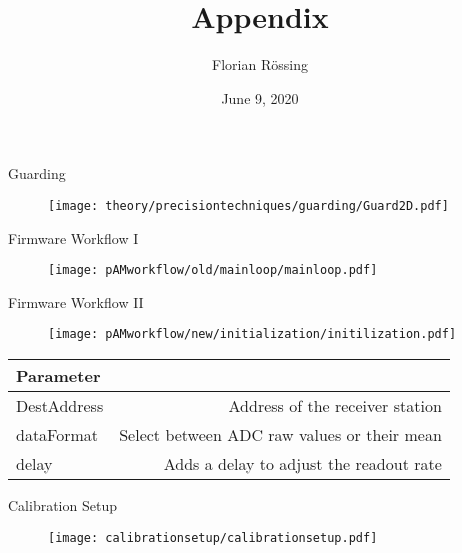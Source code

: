 \documentclass[t]{beamer}
\title{Appendix}
\author{Florian Rössing}
\date{June 9, 2020}
\begin{document}
\begin{frame}{\color{white}{.} }
\maketitle
\end{frame}

\begin{frame}[c]{Guarding}
	\begin{figure}
		\texttt{[image: theory/precisiontechniques/guarding/Guard2D.pdf]}
	\end{figure}
\end{frame}



\begin{frame}[c]{Firmware Workflow I}
	\begin{figure}
		\texttt{[image: pAMworkflow/old/mainloop/mainloop.pdf]}
	\end{figure}
\end{frame}

\begin{frame}[c]{Firmware Workflow II}
	\centering
	\begin{figure}
		\centering
		\texttt{[image: pAMworkflow/new/initialization/initilization.pdf]}
	\end{figure}
	\vspace{-0.5cm}
	\begin{table}
		\begin{tabular}{lr}
			\hline
			Parameter & \\\hline
			DestAddress & Address of the receiver station\\
			dataFormat	& Select between ADC raw values or their mean\\
			delay       & Adds a delay to adjust the readout rate\\\hline
		\end{tabular}
	\end{table}
\end{frame}

\begin{frame}[c,noframenumbering]{Calibration Setup}
		\begin{figure}
		\texttt{[image: calibrationsetup/calibrationsetup.pdf]}
	\end{figure}
\end{frame}
\end{document}

